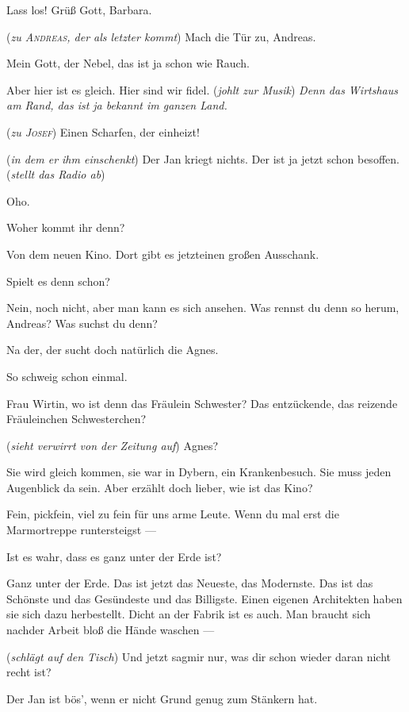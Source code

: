 \documentclass[
	final,
	a4paper,
	ngerman,
	mpinclude = true, %
	twoside = true,
	open = right,
	cleardoublepage = plain,
	DIV = 13,
	BCOR = 1cm,
	titlepage = firstiscover,
	]{scrbook}
\newcommand{\direction}[1]{(\textit{#1})}
\newcommand{\thecharacter}[1]{\textup{\textsc{#1}}\xspace}
\newcommand{\theBarbara}{\thecharacter{Barbara}}
\newcommand{\theJosef}{\thecharacter{Josef}}
\newcommand{\theGregor}{\thecharacter{Gregor}}
\newcommand{\theJan}{\thecharacter{Jan}}
\newcommand{\theAndreas}{\thecharacter{Andreas}}
\newcommand{\theLuise}{\thecharacter{Luise}}
\newcommand{\character}[1]{\item[#1]}
\newcommand{\Barbara}{\character{\theBarbara}}
\newcommand{\Josef}{\character{\theJosef}}
\newcommand{\Gregor}{\character{\theGregor}}
\newcommand{\Jan}{\character{\theJan}}
\newcommand{\Andreas}{\character{\theAndreas}}
\newcommand{\Luise}{\character{\theLuise}}
\begin{document}
\begin{play}
\Luise
Lass los! Grüß Gott, Barbara.

\Gregor
\direction{zu \theAndreas, der als letzter kommt} Mach die Tür zu, Andreas.

\Luise
Mein Gott, der Nebel, das ist ja schon wie Rauch.

\Jan
Aber hier ist es gleich. Hier sind wir fidel. \direction{johlt zur Musik} \emph{Denn das Wirtshaus am Rand, das ist ja bekannt im ganzen Land.}

\Gregor
\direction{zu \theJosef} Einen Scharfen, der einheizt!

\Josef
\direction{in dem er ihm einschenkt} Der Jan kriegt nichts. Der ist ja jetzt schon besoffen. \direction{stellt das Radio ab}

\Jan
Oho.

\Josef
Woher kommt ihr denn?

\Gregor
Von dem neuen Kino. Dort gibt es jetzteinen großen Ausschank.

\Josef
Spielt es denn schon?

\Gregor
Nein, noch nicht, aber man kann es sich ansehen. Was rennst du denn so herum, Andreas? Was suchst du denn?

\Jan
Na der, der sucht doch natürlich die Agnes.

\Andreas
So schweig schon einmal.

\Jan
Frau Wirtin, wo ist denn das Fräulein Schwester? Das entzückende, das reizende Fräuleinchen Schwesterchen?

\Barbara
\direction{sieht verwirrt von der Zeitung auf} Agnes?

\Josef
Sie wird gleich kommen, sie war in Dybern, ein Krankenbesuch. Sie muss jeden Augenblick da sein. Aber erzählt doch lieber, wie ist das Kino?

\Jan
Fein, pickfein, viel zu fein für uns arme Leute. Wenn du mal erst die Marmortreppe runtersteigst ---

\Josef
Ist es wahr, dass es ganz unter der Erde ist?

\Jan
Ganz unter der Erde. Das ist jetzt das Neueste, das Modernste. Das ist das Schönste und das Gesündeste und das Billigste. Einen eigenen Architekten haben sie sich dazu herbestellt. Dicht an der Fabrik ist es auch. Man braucht sich nachder Arbeit bloß die Hände waschen ---

\Gregor
\direction{schlägt auf den Tisch} Und jetzt sagmir nur, was dir schon wieder daran nicht recht ist?

\Josef
Der Jan ist bös', wenn er nicht Grund genug zum Stänkern hat.


\end{play}
\end{document}
